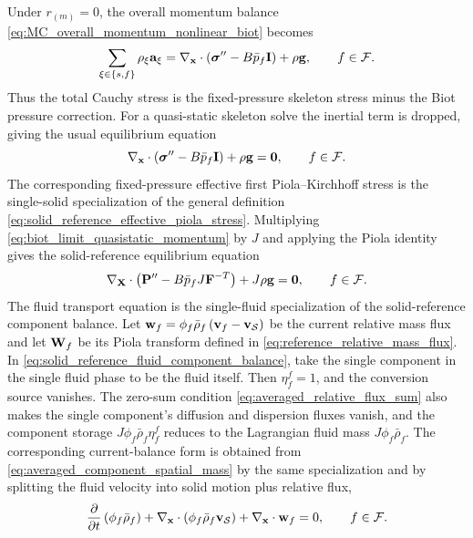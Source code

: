 Under \(r_{(m)}=0\), the overall momentum balance
\eqref{eq:MC_overall_momentum_nonlinear_biot} becomes
%
\begin{equation}
	\sum_{\xi\in\{s,f\}}\rho_\xi\mathbf{a}_\xi
	=
	\nabla_{\mathbf{x}}\cdot
	\left(
	\boldsymbol{\sigma}^{\prime\prime}
	-B\bar p_f\mathbf{I}
	\right)
	+\rho\mathbf{g},
	\qquad
	f\in\mathcal{F} .
	\label{eq:biot_limit_spatial_momentum}
\end{equation}
%
Thus the total Cauchy stress is the fixed-pressure skeleton stress minus the
Biot pressure correction.  For a quasi-static skeleton solve the inertial term
is dropped, giving the usual equilibrium equation
%
\begin{equation}
	\nabla_{\mathbf{x}}\cdot
	\left(
	\boldsymbol{\sigma}^{\prime\prime}
	-B\bar p_f\mathbf{I}
	\right)
	+\rho\mathbf{g}=\mathbf{0},
	\qquad
	f\in\mathcal{F} .
	\label{eq:biot_limit_quasistatic_momentum}
\end{equation}
%
The corresponding fixed-pressure effective first Piola--Kirchhoff stress is the
single-solid specialization of the general definition
\eqref{eq:solid_reference_effective_piola_stress}.
%
Multiplying \eqref{eq:biot_limit_quasistatic_momentum} by \(J\) and applying
the Piola identity gives the solid-reference equilibrium equation
%
\begin{equation}
	\nabla_{\mathbf{X}}\cdot
	\left(
	\mathbf{P}^{\prime\prime}
	-B\bar p_f J\mathbf{F}^{-T}
	\right)
	+J\rho\mathbf{g}
	=\mathbf{0},
	\qquad
	f\in\mathcal{F} .
	\label{eq:biot_limit_reference_momentum}
\end{equation}
%
The fluid transport equation is the single-fluid specialization of the
solid-reference component balance.  Let
\(\mathbf{w}_f=\phi_f\bar\rho_f\left(\mathbf{v}_f-\mathbf{v}_{\mathcal{S}}\right)\) be the current
relative mass flux and let \(\mathbf{W}_f\) be its Piola transform defined in
\eqref{eq:reference_relative_mass_flux}.  In
\eqref{eq:solid_reference_fluid_component_balance}, take the single component in
the single fluid phase to be the fluid itself.  Then \(\eta_f^f=1\), and the
conversion source vanishes.  The zero-sum condition
\eqref{eq:averaged_relative_flux_sum} also makes the single component's
diffusion and dispersion fluxes vanish, and the component storage
\(J\phi_f\bar\rho_f\eta_f^f\) reduces to the Lagrangian fluid mass
\(J\phi_f\bar\rho_f\).  The corresponding current-balance form is obtained from
\eqref{eq:averaged_component_spatial_mass} by the same specialization and by
splitting the fluid velocity into solid motion plus relative flux,
%
\begin{equation}
	\frac{\partial}{\partial t}\left(\phi_f\bar\rho_f\right)
	+\nabla_{\mathbf{x}}\cdot
	\left(\phi_f\bar\rho_f\mathbf{v}_{\mathcal{S}}\right)
	+\nabla_{\mathbf{x}}\cdot\mathbf{w}_f
	=0,
	\qquad
	f\in\mathcal{F} .
	\label{eq:biot_limit_current_fluid_mass_balance}
\end{equation}
